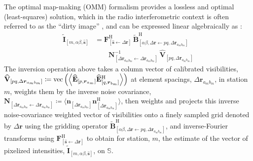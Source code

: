 \documentclass[
  journal=pasa,
  manuscript=article-type,
  year=2020,
  volume=37,
]{cup-journal}
\DeclareMathOperator{\vect}{vec}
\begin{document}
The optimal map-making (OMM) formalism \citep{Tegmark1997a} provides a lossless and optimal (least-squares) solution, which in the radio interferometric context is often referred to as the ``dirty image'' \citep{TMS2017,SIRA-II}, and can be expressed linear algebraically as \citep{Bhatnagar+2008,Morales+2009}:
\begin{align}
    \widetilde{\mathbf{I}}_{[m,\alpha\beta,\hat{\boldsymbol{s}}]} &=  \mathbf{F}^\textrm{H}_{[\hat{\boldsymbol{s}}\leftarrow\Delta\boldsymbol{r}]}\,\widetilde{\mathbf{B}}^\textrm{H}_{[\alpha\beta,\Delta\boldsymbol{r}\leftarrow pq,\Delta\boldsymbol{r}_{a_m b_m}]} \nonumber\\ 
    &\qquad \mathbf{N}^{-1}_{[\Delta\boldsymbol{r}_{a_m b_m}\leftarrow\Delta\boldsymbol{r}_{a_m b_m}]}\,\widehat{\mathbf{V}}_{[pq,\Delta\boldsymbol{r}_{a_m b_m}]} \label{eqn:intra-station-opt-pol-corr-image}
\end{align}
The inversion operation above takes a column vector of calibrated visibilities, $\widehat{\mathbf{V}}_{[pq,\Delta\boldsymbol{r}_{a_m b_m}]}\coloneqq \vect\left(\Bigl\langle\widehat{\mathbf{E}}_{[p,\boldsymbol{r}_{a_m}]}\widehat{\mathbf{E}}^\textrm{H}_{[q,\boldsymbol{r}_{b_m}]}\Bigl\rangle\right)$ at element spacings, $\Delta\boldsymbol{r}_{a_m b_m}$, in station $m$, weights them by the inverse noise covariance, $\mathbf{N}_{[\Delta\boldsymbol{r}_{a_m b_m}\leftarrow\Delta\boldsymbol{r}_{a_m b_m}]}\coloneqq \langle \boldsymbol{n}_{[\Delta\boldsymbol{r}_{a_m b_m}]}\boldsymbol{n}^\textrm{H}_{[\Delta\boldsymbol{r}_{a_m b_m}]}\rangle$, then weights and projects this inverse noise-covariance weighted vector of visibilities onto a finely sampled grid denoted by $\Delta\boldsymbol{r}$ using the gridding operator $\widetilde{\mathbf{B}}^\textrm{H}_{[\alpha\beta,\Delta\boldsymbol{r}\leftarrow pq,\Delta\boldsymbol{r}_{a_m b_m}]}$, and inverse-Fourier transforms using $\mathbf{F}^\textrm{H}_{[\hat{\boldsymbol{s}}\leftarrow\Delta\boldsymbol{r}]}$ to obtain for station, $m$, the estimate of the vector of pixelized intensities, $\widetilde{\mathbf{I}}_{[m,\alpha\beta,\hat{\boldsymbol{s}}]}$, on $\mathbb{S}$. 
\end{document}
